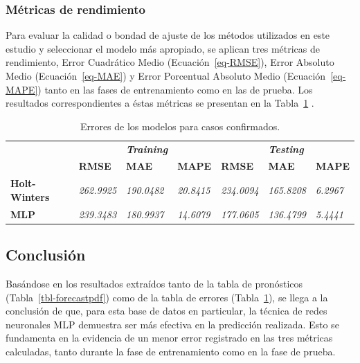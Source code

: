 \documentclass[
  us-letterpaper,
]{scrreprt}
\theoremstyle{definition}
\theoremstyle{plain}
\theoremstyle{plain}
\theoremstyle{definition}
\theoremstyle{remark}
\begin{document}
\subsubsection{Métricas de
rendimiento}\label{muxe9tricas-de-rendimiento}

Para evaluar la calidad o bondad de ajuste de los métodos utilizados en
este estudio y seleccionar el modelo más apropiado, se aplican tres
métricas de rendimiento, Error Cuadrático Medio
(Ecuación~\ref{eq-RMSE}), Error Absoluto Medio (Ecuación~\ref{eq-MAE}) y
Error Porcentual Absoluto Medio (Ecuación~\ref{eq-MAPE}) tanto en las
fases de entrenamiento como en las de prueba. Los resultados
correspondientes a éstas métricas se presentan en la Tabla~\ref{tbl-err}
.

\begin{longtable}[]{@{}
  >{\raggedright\arraybackslash}p{}
  >{\centering\arraybackslash}p{}
  >{\centering\arraybackslash}p{}
  >{\centering\arraybackslash}p{}
  >{\centering\arraybackslash}p{}
  >{\centering\arraybackslash}p{}
  >{\centering\arraybackslash}p{}@{}}
\caption{Errores de los modelos para casos
confirmados.}\label{tbl-err}\tabularnewline
\toprule\noalign{}
\endfirsthead
\endhead
\bottomrule\noalign{}
\endlastfoot
& & \textbf{\emph{Training}} & & & \textbf{\emph{Testing}} & \\
& \textbf{RMSE} & \textbf{MAE} & \textbf{MAPE} & \textbf{RMSE} &
\textbf{MAE} & \textbf{MAPE} \\
\textbf{Holt-Winters} & \emph{262.9925} & \emph{190.0482} &
\emph{20.8415} & \emph{234.0094} & \emph{165.8208} & \emph{6.2967} \\
\textbf{MLP} & \emph{239.3483} & \emph{180.9937} & \emph{14.6079} &
\emph{177.0605} & \emph{136.4799} & \emph{5.4441} \\
\end{longtable}

\subsection{Conclusión}\label{conclusiuxf3n}

Basándose en los resultados extraídos tanto de la tabla de pronósticos
(Tabla~\ref{tbl-forecastpdf}) como de la tabla de errores
(Tabla~\ref{tbl-err}), se llega a la conclusión de que, para esta base
de datos en particular, la técnica de redes neuronales MLP demuestra ser
más efectiva en la predicción realizada. Esto se fundamenta en la
evidencia de un menor error registrado en las tres métricas calculadas,
tanto durante la fase de entrenamiento como en la fase de prueba.
\end{document}
